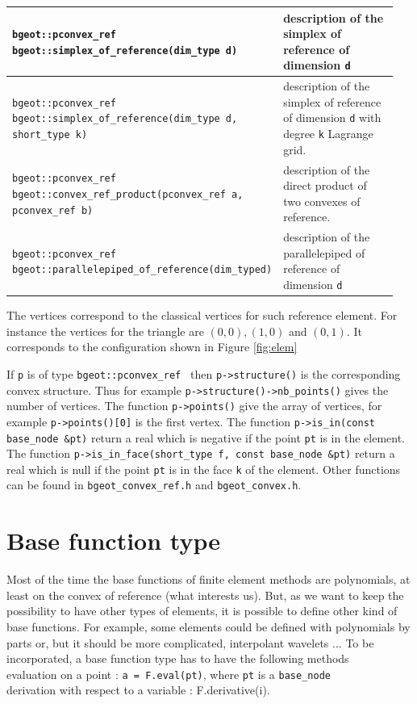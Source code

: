 \documentclass[11pt,a4paper]{article}
\begin{document}
\begin{center} \begin{tabular}{|m{0.55\linewidth}|m{0.4\linewidth}|} \hline
{\tt bgeot::pconvex\_ref $\;$ bgeot::simplex\_of\_reference(dim\_type d)} & description of the simplex of reference of dimension {\tt d} \\ \hline
  
  {\tt bgeot::pconvex\_ref $\;$ bgeot::simplex\_of\_reference(dim\_type d, short\_type k)} & description of the simplex of reference of dimension {\tt d} with degree {\tt k} Lagrange grid. \\ \hline

  {\tt bgeot::pconvex\_ref $\;$ bgeot::convex\_ref\_product(pconvex\_ref a, pconvex\_ref b)} & description of the direct product of two convexes of reference.\\ \hline
  
  {\tt bgeot::pconvex\_ref $\;$ bgeot::parallelepiped\_of\_reference(dim\_type\;d)} & description of the parallelepiped of reference of dimension {\tt d}  \\ \hline
\end{tabular} \end{center}

The vertices correspond to the classical vertices for such reference element. For instance the vertices for the triangle are $(0, 0), (1, 0)$ and $(0, 1)$. It corresponds to the configuration shown in Figure \ref{fig:elem}

If {\tt p} is of type {\tt bgeot::pconvex\_ref } then {\tt p->structure()} is the corresponding convex structure. Thus for example {\tt p->structure()->nb\_points()} gives the number of vertices. The function {\tt p->points()} give the array of vertices, for example {\tt p->points()[0]} is the first vertex. The function {\tt p->is\_in(const base\_node \&pt)} return a real which is negative if the point {\tt pt} is in the element. The function {\tt p->is\_in\_face(short\_type f, const base\_node \&pt)} return a real which is null if the point {\tt pt} is in the face {\tt k} of the element. Other functions can be found in {\tt bgeot\_convex\_ref.h} and {\tt bgeot\_convex.h}.


\section{Base function type}

Most of the time the base functions of finite element methods are polynomials, at least on the convex of reference (what interests us). But, as we want to keep the possibility to have other types of elements, it is possible to define other kind of base functions. For example, some elements could be defined with polynomials by parts or, but it should be more complicated, interpolant wavelets ... To be incorporated, a base function type has to have the following methods\\[0.5cm]
evaluation on a point : {\tt a = F.eval(pt)}, where {\tt pt} is a {\tt base\_node} \\[0.5cm]
derivation with respect to a variable : F.derivative(i).\\[0.5cm]
\end{document}
